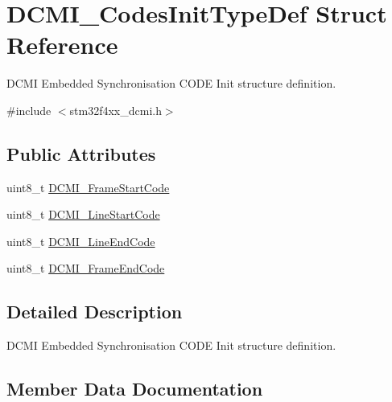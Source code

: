 \hypertarget{struct_d_c_m_i___codes_init_type_def}{}\section{D\+C\+M\+I\+\_\+\+Codes\+Init\+Type\+Def Struct Reference}
\label{struct_d_c_m_i___codes_init_type_def}


D\+C\+M\+I Embedded Synchronisation C\+O\+D\+E Init structure definition.  




{\ttfamily \#include $<$stm32f4xx\+\_\+dcmi.\+h$>$}

\subsection*{Public Attributes}
\begin{DoxyCompactItemize}
\item 
uint8\+\_\+t \hyperlink{struct_d_c_m_i___codes_init_type_def_a3b8da4e40e51dfd9641e8cb729fb1ffa}{D\+C\+M\+I\+\_\+\+Frame\+Start\+Code}
\item 
uint8\+\_\+t \hyperlink{struct_d_c_m_i___codes_init_type_def_a52df641c10fe4fb79eefa2db68c65f49}{D\+C\+M\+I\+\_\+\+Line\+Start\+Code}
\item 
uint8\+\_\+t \hyperlink{struct_d_c_m_i___codes_init_type_def_a5d609eda1abbf53705d5d20a1bdabccc}{D\+C\+M\+I\+\_\+\+Line\+End\+Code}
\item 
uint8\+\_\+t \hyperlink{struct_d_c_m_i___codes_init_type_def_a1feb31acae8822c64ed5541b6da8f7e1}{D\+C\+M\+I\+\_\+\+Frame\+End\+Code}
\end{DoxyCompactItemize}


\subsection{Detailed Description}
D\+C\+M\+I Embedded Synchronisation C\+O\+D\+E Init structure definition. 

\subsection{Member Data Documentation}
\hypertarget{struct_d_c_m_i___codes_init_type_def_a1feb31acae8822c64ed5541b6da8f7e1}{}
